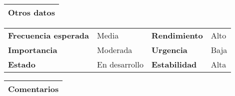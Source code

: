 \documentclass[11pt,a4paper]{article}
\begin{document}
\begin{table}[H]
	\begin{tabularx}{\textwidth}{X}
		\textbf{Otros datos}\\ \hline
	\end{tabularx}

	\begin{tabularx}{\textwidth}{lXlX}
		\textbf{Frecuencia esperada} & Media & \textbf{Rendimiento} & Alto\\
		\textbf{Importancia} & Moderada & \textbf{Urgencia} & Baja\\
		\textbf{Estado} & En desarrollo & \textbf{Estabilidad} & Alta\\
	\end{tabularx}
	
	\begin{tabularx}{\textwidth}{X}
		\textbf{Comentarios}\\ \hline
	\end{tabularx}
\end{table}

\newpage


\end{document}
